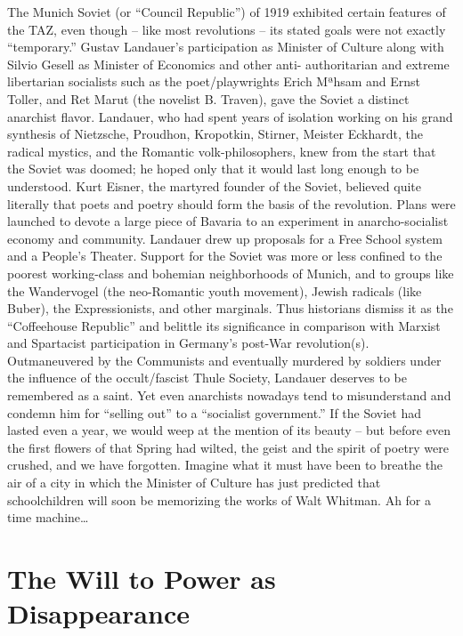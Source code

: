 \documentclass[a4paper,english,10pt,twoside]{article}
\begin{document}
\medskip
The Munich Soviet (or \enquote{Council Republic}) of 1919 exhibited certain features of the TAZ, even though -- like most revolutions -- its stated goals were not exactly \enquote{temporary.} Gustav Landauer's participation as Minister of Culture along with Silvio Gesell as Minister of Economics and other anti- authoritarian and extreme libertarian socialists such as the poet/playwrights Erich Mªhsam and Ernst Toller, and Ret Marut (the novelist B. Traven), gave the Soviet a distinct anarchist flavor. Landauer, who had spent years of isolation working on his grand synthesis of Nietzsche, Proudhon, Kropotkin, Stirner, Meister Eckhardt, the radical mystics, and the Romantic volk-philosophers, knew from the start that the Soviet was doomed; he hoped only that it would last long enough to be understood. Kurt Eisner, the martyred founder of the Soviet, believed quite literally that poets and poetry should form the basis of the revolution. Plans were launched to devote a large piece of Bavaria to an experiment in anarcho-socialist economy and community. Landauer drew up proposals for a Free School system and a People's Theater. Support for the Soviet was more or less confined to the poorest working-class and bohemian neighborhoods of Munich, and to groups like the Wandervogel (the neo-Romantic youth movement), Jewish radicals (like Buber), the Expressionists, and other marginals. Thus historians dismiss it as the \enquote{Coffeehouse Republic} and belittle its significance in comparison with Marxist and Spartacist participation in Germany's post-War revolution(s). Outmaneuvered by the Communists and eventually murdered by soldiers under the influence of the occult/fascist Thule Society, Landauer deserves to be remembered as a saint. Yet even anarchists nowadays tend to misunderstand and condemn him for \enquote{selling out} to a \enquote{socialist government.} If the Soviet had lasted even a year, we would weep at the mention of its beauty -- but before even the first flowers of that Spring had wilted, the geist and the spirit of poetry were crushed, and we have forgotten. Imagine what it must have been to breathe the air of a city in which the Minister of Culture has just predicted that schoolchildren will soon be memorizing the works of Walt Whitman. Ah for a time machine… 

\section{The Will to Power as Disappearance}
\end{document}
